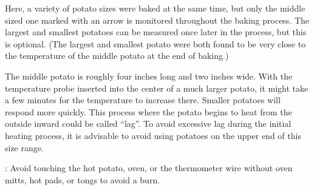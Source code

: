\documentclass{ximera}
\begin{document}
Here, a variety of potato sizes were baked at the same time, but only the middle sized one marked with an arrow is monitored throughout the baking process.  The largest and smallest potatoes can be measured once later in the process, but this is optional.  (The largest and smallest potato were both found to be very close to the temperature of the middle potato at the end of baking.)
  
The middle potato is roughly four inches long and two inches wide.  With the temperature probe inserted into the center of a much larger potato, it might take a few minutes for the temperature to increase there.  Smaller potatoes will respond more quickly.  This process where the potato begins to heat from the outside inward could be called ``lag''.  To avoid excessive lag during the initial heating process, it is advisable to avoid using potatoes on the upper end of this size range.   
 
\begin{warning}: Avoid touching the hot potato, oven, or the thermometer wire without oven mitts, hot pads, or tongs to avoid a burn.
\end{warning}
 
\end{document}
